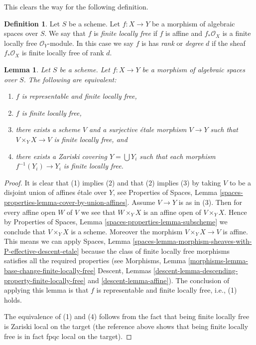 \documentclass{stacks-project}
\theoremstyle{plain}
\newtheorem{lemma}[subsection]{Lemma}
\theoremstyle{definition}
\newtheorem{definition}[subsection]{Definition}
\theoremstyle{remark}
\numberwithin{equation}{subsection}
\begin{document}
\noindent
This clears the way for the following definition.

\begin{definition}
\label{definition-finite-locally-free}
Let $S$ be a scheme.
Let $f : X \to Y$ be a morphism of algebraic spaces over $S$.
We say that $f$ is {\it finite locally free} if $f$ is affine
and $f_*\mathcal{O}_X$ is a finite locally free $\mathcal{O}_Y$-module.
In this case we say $f$ is
has {\it rank} or {\it degree} $d$
if the sheaf $f_*\mathcal{O}_X$ is finite locally free of rank $d$.
\end{definition}

\begin{lemma}
\label{lemma-finite-locally-free-local}
Let $S$ be a scheme.
Let $f : X \to Y$ be a morphism of algebraic spaces over $S$.
The following are equivalent:
\begin{enumerate}
\item $f$ is representable and finite locally free,
\item $f$ is finite locally free,
\item there exists a scheme $V$ and a surjective \'etale morphism
$V \to Y$ such that $V \times_Y X \to V$ is finite locally free, and
\item there exists a Zariski covering $Y = \bigcup Y_i$ such that
each morphism $f^{-1}(Y_i) \to Y_i$ is finite locally free.
\end{enumerate}
\end{lemma}

\begin{proof}
It is clear that (1) implies (2) and that (2) implies (3) by taking
$V$ to be a disjoint union of affines \'etale over $Y$, see
Properties of Spaces,
Lemma \ref{spaces-properties-lemma-cover-by-union-affines}.
Assume $V \to Y$ is as in (3). Then for every affine open $W$ of $V$ we see
that $W \times_Y X$ is an affine open of $V \times_Y X$. Hence by
Properties of Spaces, Lemma \ref{spaces-properties-lemma-subscheme}
we conclude that $V \times_Y X$ is a scheme. Moreover the morphism
$V \times_Y X \to V$ is affine. This means we can apply
Spaces,
Lemma \ref{spaces-lemma-morphism-sheaves-with-P-effective-descent-etale}
because the class of finite locally free morphisms
satisfies all the required properties (see
Morphisms, Lemma \ref{morphisms-lemma-base-change-finite-locally-free}
Descent, Lemmas \ref{descent-lemma-descending-property-finite-locally-free}
and \ref{descent-lemma-affine}).
The conclusion of applying this lemma is that $f$ is representable
and finite locally free, i.e., (1) holds.

\medskip\noindent
The equivalence of (1) and (4) follows from the fact that being
finite locally free is Zariski local on the target (the reference above shows
that being finite locally free is in fact fpqc local on the target).
\end{proof}
\end{document}
